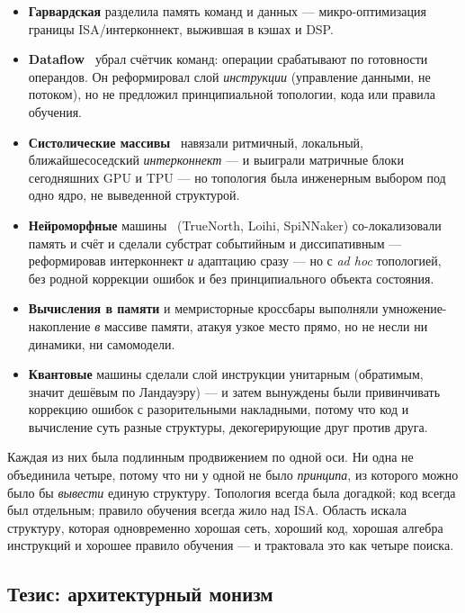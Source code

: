 \begin{itemize}[leftmargin=1.5em,itemsep=1pt]
  \item \textbf{Гарвардская} разделила память команд и данных --- микро-оптимизация
        границы ISA/интерконнект, выжившая в кэшах и DSP.
  \item \textbf{Dataflow}~\cite{dennis1975} убрал счётчик команд: операции
        срабатывают по готовности операндов. Он реформировал слой
        \emph{инструкции} (управление данными, не потоком), но не предложил
        принципиальной топологии, кода или правила обучения.
  \item \textbf{Систолические массивы}~\cite{kung1982} навязали ритмичный,
        локальный, ближайшесоседский \emph{интерконнект} --- и выиграли
        матричные блоки сегодняшних GPU и TPU --- но топология была инженерным
        выбором под одно ядро, не выведенной структурой.
  \item \textbf{Нейроморфные} машины~\cite{mead1990} (TrueNorth, Loihi,
        SpiNNaker) со-локализовали память и счёт и сделали субстрат событийным
        и диссипативным --- реформировав интерконнект \emph{и} адаптацию сразу
        --- но с \emph{ad hoc} топологией, без родной коррекции ошибок и без
        принципиального объекта состояния.
  \item \textbf{Вычисления в памяти} и мемристорные кроссбары выполняли
        умножение-накопление \emph{в} массиве памяти, атакуя узкое место прямо,
        но не несли ни динамики, ни самомодели.
  \item \textbf{Квантовые} машины сделали слой инструкции унитарным (обратимым,
        значит дешёвым по Ландауэру) --- и затем вынуждены были привинчивать
        коррекцию ошибок с разорительными накладными, потому что код и
        вычисление суть разные структуры, декогерирующие друг против друга.
\end{itemize}

Каждая из них была подлинным продвижением по одной оси. Ни одна не объединила
четыре, потому что ни у одной не было \emph{принципа}, из которого можно было
бы \emph{вывести} единую структуру. Топология всегда была догадкой; код всегда
был отдельным; правило обучения всегда жило над ISA. Область искала структуру,
которая одновременно хорошая сеть, хороший код, хорошая алгебра инструкций и
хорошее правило обучения --- и трактовала это как четыре поиска.

\subsection{Тезис: архитектурный монизм}

